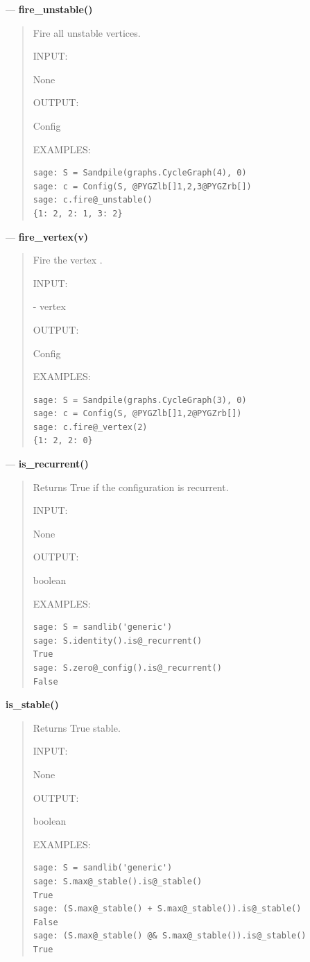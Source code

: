 \documentclass[letterpaper,10pt,english]{manual}
\begin{document}
---
\hypertarget{fire-unstable}{}
\textbf{fire\_unstable()}
\begin{quote}

Fire all unstable vertices.

INPUT:

None

OUTPUT:

Config

EXAMPLES:

\begin{Verbatim}[commandchars=@\[\]]
sage: S = Sandpile(graphs.CycleGraph(4), 0)
sage: c = Config(S, @PYGZlb[]1,2,3@PYGZrb[])
sage: c.fire@_unstable()
{1: 2, 2: 1, 3: 2}
\end{Verbatim}
\end{quote}

---
\hypertarget{fire-vertex-v}{}
\textbf{fire\_vertex(v)}
\begin{quote}

Fire the vertex .

INPUT:

 - vertex

OUTPUT:

Config

EXAMPLES:

\begin{Verbatim}[commandchars=@\[\]]
sage: S = Sandpile(graphs.CycleGraph(3), 0)
sage: c = Config(S, @PYGZlb[]1,2@PYGZrb[])
sage: c.fire@_vertex(2)
{1: 2, 2: 0}
\end{Verbatim}
\end{quote}

---
\hypertarget{is-recurrent}{}
\textbf{is\_recurrent()}
\begin{quote}

Returns True if the configuration is recurrent.

INPUT:

None

OUTPUT:

boolean

EXAMPLES:

\begin{Verbatim}[commandchars=@\[\]]
sage: S = sandlib('generic')
sage: S.identity().is@_recurrent()
True
sage: S.zero@_config().is@_recurrent()
False
\end{Verbatim}
\end{quote}
\hypertarget{is-stable}{}
\textbf{is\_stable()}
\begin{quote}

Returns True stable.

INPUT:

None

OUTPUT:

boolean

EXAMPLES:

\begin{Verbatim}[commandchars=@\[\]]
sage: S = sandlib('generic')
sage: S.max@_stable().is@_stable()
True
sage: (S.max@_stable() + S.max@_stable()).is@_stable()
False
sage: (S.max@_stable() @& S.max@_stable()).is@_stable()
True
\end{Verbatim}
\end{quote}
\end{document}
